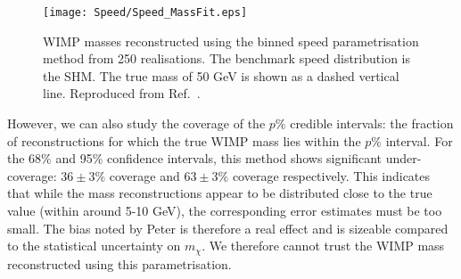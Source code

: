  \begin{figure}[t]
\centering
  \texttt{[image: Speed/Speed\_MassFit.eps]}
  \caption[Distribution of reconstructed WIMP masses using the binned speed parametrisation]{WIMP masses reconstructed using the binned speed parametrisation method from 250 realisations. The benchmark speed distribution is the SHM. The true mass of 50 GeV is shown as a dashed vertical line. Reproduced from Ref.~\cite{Kavanagh:2012}.}
  \label{fig:Speed:Speed_MassFit}
\end{figure}

However, we can also study the coverage of the $p\%$ credible intervals: the fraction of reconstructions for which the true WIMP mass lies within the $p\%$ interval. For the 68\% and 95\% confidence intervals, this method shows significant under-coverage: \(36 \pm 3 \%\) coverage and \(63 \pm 3 \%\) coverage respectively. This indicates that while the mass reconstructions appear to be distributed close to the true value (within around 5-10 GeV), the corresponding error estimates must be too small.  The bias noted by Peter is therefore a real effect and is sizeable compared to the statistical uncertainty on $m_\chi$. We therefore cannot trust the WIMP mass reconstructed using this parametrisation.

